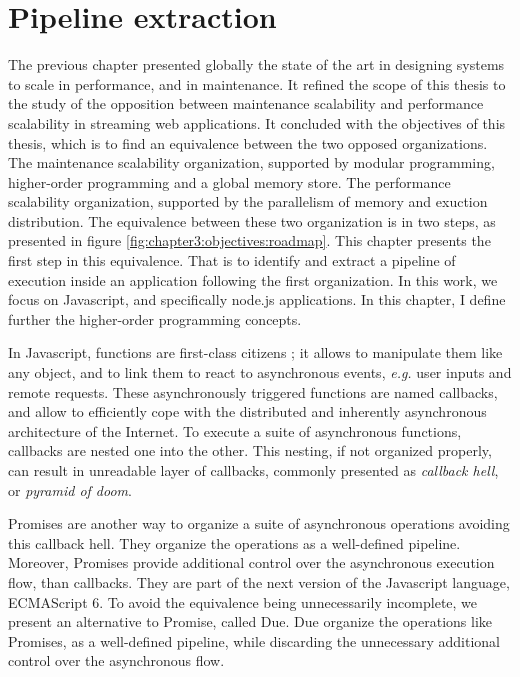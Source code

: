 \chapter{Pipeline extraction} \label{chapter4}

The previous chapter presented globally the state of the art in designing systems to scale in performance, and in maintenance.
It refined the scope of this thesis to the study of the opposition between maintenance scalability and performance scalability in streaming web applications.
It concluded with the objectives of this thesis, which is to find an equivalence between the two opposed organizations.
The maintenance scalability organization, supported by modular programming, higher-order programming and a global memory store.
The performance scalability organization, supported by the parallelism of memory and exuction distribution.
The equivalence between these two organization is in two steps, as presented in figure \ref{fig:chapter3:objectives:roadmap}.
This chapter presents the first step in this equivalence.
That is to identify and extract a pipeline of execution inside an application following the first organization.
In this work, we focus on Javascript, and specifically node.js applications.
In this chapter, I define further the higher-order programming concepts.

In Javascript, functions are first-class citizens ; it allows to manipulate them like any object, and to link them to react to asynchronous events, \textit{e.g.} user inputs and remote requests.
These asynchronously triggered functions are named callbacks, and allow to efficiently cope with the distributed and inherently asynchronous architecture of the Internet.
To execute a suite of asynchronous functions, callbacks are nested one into the other.
This nesting, if not organized properly, can result in unreadable layer of callbacks, commonly presented as \textit{callback hell}, or \textit{pyramid of doom}.

Promises are another way to organize a suite of asynchronous operations avoiding this callback hell.
They organize the operations as a well-defined pipeline.
Moreover, Promises provide additional control over the asynchronous execution flow, than callbacks.
They are part of the next version of the Javascript language, ECMAScript 6.
To avoid the equivalence being unnecessarily incomplete, we present an alternative to Promise, called Due.
Due organize the operations like Promises, as a well-defined pipeline, while discarding the unnecessary additional control over the asynchronous flow.


